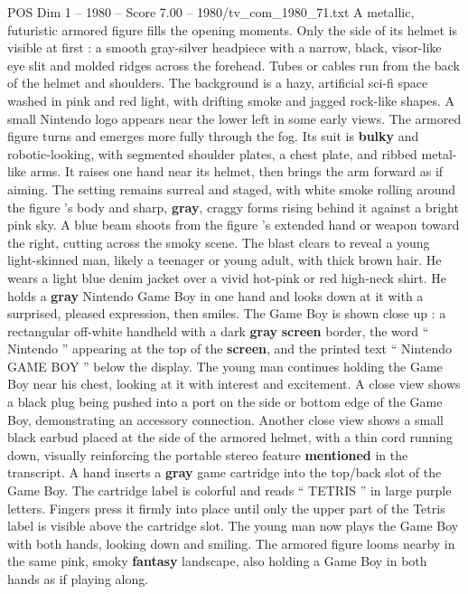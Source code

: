 \begin{textsample}{POS Dim 1 – 1980 – Score 7.00 – 1980/tv\_com\_1980\_71.txt}  \label{ex:f1_pos_056}
A metallic, futuristic armored figure fills the opening moments.
Only the side of its helmet is visible at first : a smooth gray-silver headpiece with a narrow, black, visor-like eye slit and molded ridges across the forehead.
Tubes or cables run from the back of the helmet and shoulders.
The background is a hazy, artificial sci-fi space washed in pink and red light, with drifting smoke and jagged rock-like shapes.
A small Nintendo logo appears near the lower left in some early views.
The armored figure turns and emerges more fully through the fog.
Its suit is \textbf{bulky} and robotic-looking, with segmented shoulder plates, a chest plate, and ribbed metal-like arms.
It raises one hand near its helmet, then brings the arm forward as if aiming.
The setting remains surreal and staged, with white smoke rolling around the figure ’s body and sharp, \textbf{gray}, craggy forms rising behind it against a bright pink sky.
A blue beam shoots from the figure ’s extended hand or weapon toward the right, cutting across the smoky scene.
The blast clears to reveal a young light-skinned man, likely a teenager or young adult, with thick brown hair.
He wears a light blue denim jacket over a vivid hot-pink or red high-neck shirt.
He holds a \textbf{gray} Nintendo Game Boy in one hand and looks down at it with a surprised, pleased expression, then smiles.
The Game Boy is shown close up : a rectangular off-white handheld with a dark \textbf{gray} \textbf{screen} border, the word “ Nintendo ” appearing at the top of the \textbf{screen}, and the printed text “ Nintendo GAME BOY ” below the display.
The young man continues holding the Game Boy near his chest, looking at it with interest and excitement.
A close view shows a black plug being pushed into a port on the side or bottom edge of the Game Boy, demonstrating an accessory connection.
Another close view shows a small black earbud placed at the side of the armored helmet, with a thin cord running down, visually reinforcing the portable stereo feature \textbf{mentioned} in the transcript.
A hand inserts a \textbf{gray} game cartridge into the top/back slot of the Game Boy.
The cartridge label is colorful and reads “ TETRIS ” in large purple letters.
Fingers press it firmly into place until only the upper part of the Tetris label is visible above the cartridge slot.
The young man now plays the Game Boy with both hands, looking down and smiling.
The armored figure looms nearby in the same pink, smoky \textbf{fantasy} landscape, also holding a Game Boy in both hands as if playing along.

\end{textsample}

